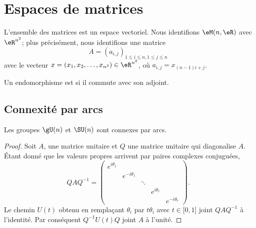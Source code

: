 
\section{Espaces de matrices}

L'ensemble des matrices est un espace vectoriel. Nous identifions $\eM(n,\eR)$ avec $ \eR^{n^2}$; plus précisément, nous identifions une matrice 
\begin{equation}
    A = (a_{i,j})_{1\leq i \leq n, 1 \leq j \leq n}
\end{equation}
avec le vecteur $x = (x_1, x_2, \dots, x_{n^2}) \in \eR^{n^2}$, où $ a_{i,j} = x_{(n-1)i + j}$. 

\begin{definition}  \label{DefWQNooKEeJzv}
    Un endomorphisme est  si il commute avec son adjoint.
\end{definition}

\subsection{Connexité par arcs}

\begin{lemma}
    Les groupes \( \gU(n)\) et \( \SU(n)\) sont connexes par arcs.
\end{lemma}

\begin{proof}
    Soit \( A\), une matrice unitaire et \( Q\) une matrice unitaire qui diagonalise \( A\). Étant donné que les valeurs propres arrivent par paires complexes conjuguées,
    \begin{equation}
        QAQ^{-1}=\begin{pmatrix}
            e^{i\theta_1}    &       &       &       &   \\  
            &    e^{-i\theta_1}    &       &       &   \\  
            &       &    \ddots    &       &   \\  
            &       &       &    e^{i\theta_r}    &   \\  
            &       &       &       &        e^{-i\theta_r}
        \end{pmatrix}.
    \end{equation}
    Le chemin \( U(t)\) obtenu en remplaçant \( \theta_i\) par \( t\theta_i\) avec \( t\in\mathopen[ 0 , 1 \mathclose]\) joint \( QAQ^{-1}\) à l'identité. Par conséquent \( Q^{-1}U(t)Q\) joint \( A\) à l'unité.
\end{proof}

